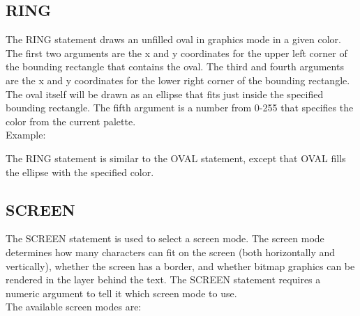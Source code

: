 \subsection{RING}

The {\ttfamily RING} statement draws an unfilled oval in graphics mode in a
given color.  The first two arguments are the x and y coordinates for the upper
left corner of the bounding rectangle that contains the oval.  The third and
fourth arguments are the x and y coordinates for the lower right corner of the
bounding rectangle.  The oval itself will be drawn as an ellipse that fits just
inside the specified bounding rectangle.  The fifth argument is a number from
0-255 that specifies the color from the current palette.\\

Example:\\


The {\ttfamily RING} statement is similar to the {\ttfamily OVAL} statement,
except that {\ttfamily OVAL} fills the ellipse with the specified color.

\subsection{SCREEN}

The {\ttfamily SCREEN} statement is used to select a screen mode.  The screen
mode determines how many characters can fit on the screen (both horizontally
and vertically), whether the screen has a border, and whether bitmap graphics
can be rendered in the layer behind the text.  The {\ttfamily SCREEN} statement
requires a numeric argument to tell it which screen mode to use.\\

The available screen modes are:\\


